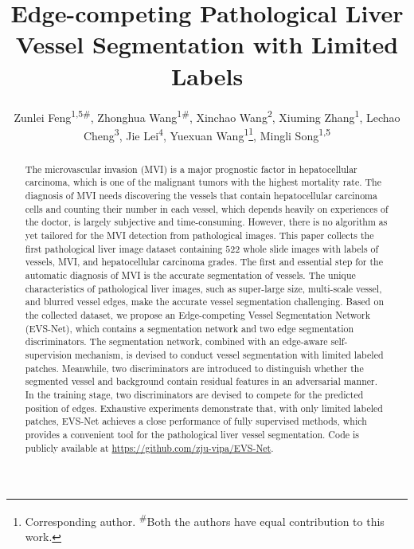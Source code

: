 \documentclass[letterpaper]{article} %
\title{Edge-competing Pathological Liver Vessel Segmentation with Limited Labels}
\author{
    Zunlei Feng\textsuperscript{\rm 1,\rm 5\#}, Zhonghua Wang\textsuperscript{\rm 1\#}, Xinchao Wang\textsuperscript{\rm 2}, Xiuming Zhang\textsuperscript{\rm 1}, Lechao Cheng\textsuperscript{\rm 3}, Jie Lei\textsuperscript{\rm 4},
    Yuexuan Wang\textsuperscript{\rm 1}\thanks{Corresponding author. \textsuperscript{\#}Both the authors have equal contribution to this work.},
     Mingli Song\textsuperscript{\rm 1,\rm 5}\\
}
\begin{document}

\def\mathbi#1{\textbf{\em #1}}

\maketitle

\begin{abstract}
The microvascular invasion (MVI) is a major prognostic factor in hepatocellular carcinoma,
which is one of the malignant tumors with the highest mortality rate.
The diagnosis of MVI needs discovering the vessels that contain hepatocellular carcinoma cells and counting their number in each vessel,
which depends heavily on experiences
of the doctor, is largely subjective and  time-consuming.
However, there is no algorithm as yet tailored for
the MVI detection from  pathological images.
This paper collects the first pathological liver image dataset
containing $522$ whole slide images with labels of vessels,
MVI, and hepatocellular carcinoma grades.
The first and essential step for the
automatic diagnosis of MVI is the accurate segmentation of vessels.
The unique characteristics of
 pathological liver images,
such as super-large size, multi-scale vessel, and blurred vessel edges,
make the accurate vessel segmentation challenging.
Based on the collected dataset, we propose an Edge-competing
Vessel Segmentation Network (EVS-Net), which contains a segmentation
network and two edge segmentation discriminators.
The segmentation network, combined with an edge-aware self-supervision mechanism,
is devised to conduct vessel segmentation with limited labeled patches.
Meanwhile, two discriminators are introduced to distinguish
whether the segmented vessel and background contain residual
features in an adversarial manner.
In the training stage, two discriminators are devised to
compete for the predicted  position of edges.
Exhaustive experiments demonstrate that, with only limited
labeled patches, EVS-Net achieves a close performance of fully
supervised methods, which provides a convenient tool for
the pathological liver vessel segmentation.
Code is publicly available at \url{https://github.com/zju-vipa/EVS-Net}.


\end{abstract}
\end{document}
